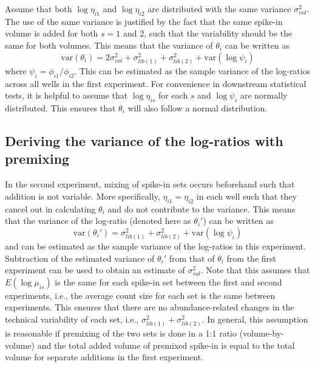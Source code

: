 \documentclass{article}
\begin{document}
Assume that both $\log \eta_{i1}$ and $\log \eta_{i2}$ are distributed with the same variance $\sigma^2_{vol}$.
The use of the same variance is justified by the fact that the same spike-in volume is added for both $s=1$ and $2$, such that the variability should be the same for both volumes.
This means that the variance of $\theta_i$ can be written as
\[
\mbox{var}(\theta_i) = 2\sigma_{vol}^2 + \sigma^2_{lib(1)} + \sigma^2_{lib(2)} + \mbox{var}(\log \psi_i)
\]
where $\psi_i = \phi_{i1}/\phi_{i2}$.
This can be estimated as the sample variance of the log-ratios across all wells in the first experiment. 
For convenience in downstream statistical tests, it is helpful to assume that $\log \eta_{is}$ for each $s$ and $\log \psi_i$ are normally distributed.
This ensures that $\theta_i$ will also follow a normal distribution.

\subsection{Deriving the variance of the log-ratios with premixing}
In the second experiment, mixing of spike-in sets occurs beforehand such that addition is not variable.
More specifically, $\eta_{i1}=\eta_{i2}$ in each well such that they cancel out in calculating $\theta_i$ and do not contribute to the variance.
This means that the variance of the log-ratio (denoted here as $\theta_i'$) can be written as
\[
    \mbox{var}(\theta_i') = \sigma^2_{lib(1)} + \sigma^2_{lib(2)} + \mbox{var}(\log \psi_i)
\]
and can be estimated as the sample variance of the log-ratios in this experiment.
Subtraction of the estimated variance of $\theta_i'$ from that of $\theta_i$ from the first experiment can be used to obtain an estimate of $\sigma^2_{vol}$.
Note that this assumes that $E(\log \mu_{is})$ is the same for each spike-in set between the first and second experiments, i.e., the average count size for each set is the same between experiments.
This ensures that there are no abundance-related changes in the technical variability of each set, i.e., $ \sigma^2_{lib(1)} + \sigma^2_{lib(2)}$.
In general, this assumption is reasonable if premixing of the two sets is done in a 1:1 ratio (volume-by-volume) and the total added volume of premixed spike-in is equal to the total volume for separate additions in the first experiment.
\end{document}
